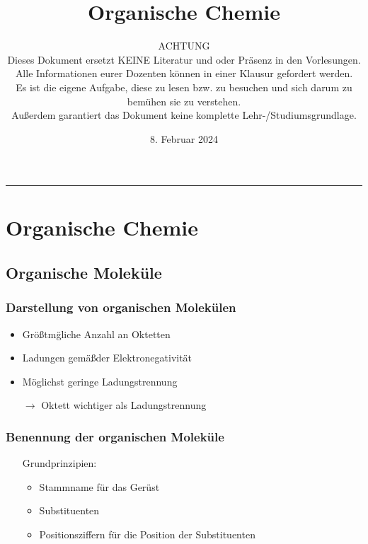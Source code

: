 \documentclass[a4paper, fleqn]{article}
\title{Organische Chemie}
\date{8. Februar 2024}
\author{ACHTUNG\\Dieses Dokument ersetzt KEINE Literatur und oder Pr\"asenz in den Vorlesungen.\\Alle Informationen eurer Dozenten k\"onnen in einer Klausur gefordert werden.\\Es ist die eigene Aufgabe, diese zu lesen bzw. zu besuchen und sich darum zu bem\"uhen sie zu verstehen.\\Au\ss erdem garantiert das Dokument keine komplette Lehr-/Studiumsgrundlage.}
\begin{document}
\tableofcontents
\newpage
\maketitle
\hrule

\section{Organische Chemie}
\subsection{Organische Molek\"ule}
\subsubsection{Darstellung von organischen Molek\"ulen}
\begin{itemize}
  \item Gr\"o\ss tm\"gliche Anzahl an Oktetten
  \item Ladungen gem\"a\ss der Elektronegativit\"at 
  \item M\"oglichst geringe Ladungstrennung
  \item[$\rightarrow$] Oktett wichtiger als Ladungstrennung
\end{itemize}

\subsubsection{Benennung der organischen Molek\"ule}
\begin{itemize}
  \item[] Grundprinzipien: \begin{itemize}
    \item Stammname f\"ur das Ger\"ust
    \item Substituenten
    \item Positionsziffern f\"ur die Position der Substituenten
  \end{itemize}
\end{itemize}
\end{document}

